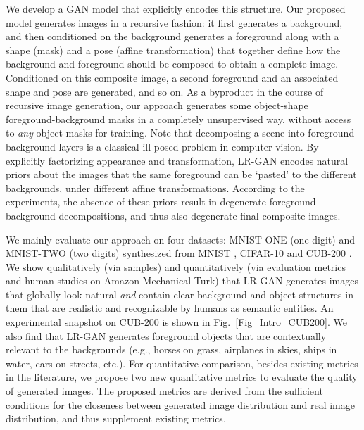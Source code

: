 \documentclass{article} \usepackage{iclr2017_conference,times}
\begin{document}
We develop a GAN model that explicitly encodes this structure. Our proposed model generates images in a recursive fashion: it first generates a background, and then conditioned on the background generates a foreground along with a shape (mask) and a pose (affine transformation) that together define how the background and foreground should be composed to obtain a complete image. Conditioned on this composite image, a second foreground and an associated shape and pose are generated, and so on. As a byproduct in the course of recursive image generation, our approach generates some object-shape foreground-background masks in a completely unsupervised way, without access to \emph{any} object masks for training. Note that decomposing a scene into foreground-background layers is a classical ill-posed problem in computer vision. By explicitly factorizing appearance and transformation, LR-GAN encodes natural priors about the images that the same foreground can be `pasted' to the different backgrounds, under different affine transformations. According to the experiments, the absence of these priors result in degenerate foreground-background decompositions, and thus also degenerate final composite images.

We mainly evaluate our approach on four datasets: MNIST-ONE (one digit) and MNIST-TWO (two digits) synthesized from MNIST \citep{MNIST}, CIFAR-10 \citep{CIFAR10} and CUB-200 \citep{CUB200}. We show qualitatively (via samples) and quantitatively (via evaluation metrics and human studies on Amazon Mechanical Turk) that LR-GAN generates images that globally look natural \emph{and} contain clear background and object structures in them that are realistic and recognizable by humans as semantic entities. An experimental snapshot on CUB-200 is shown in Fig.~\ref{Fig_Intro_CUB200}. We also find that LR-GAN generates foreground objects that are contextually relevant to the backgrounds (e.g., horses on grass, airplanes in skies, ships in water, cars on streets, etc.). For quantitative comparison, besides existing metrics in the literature, we propose two new quantitative metrics to evaluate the quality of generated images. The proposed metrics are derived from the sufficient conditions for the closeness between generated image distribution and real image distribution, and thus supplement existing metrics.
\end{document}
